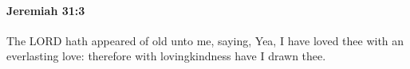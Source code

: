 
		\paragraph{Jeremiah 31:3} %
			\label{JEREMIAH-31-3}

			The LORD hath appeared of old unto me, saying, Yea, I have loved thee with an everlasting love: therefore with lovingkindness have I drawn thee.


